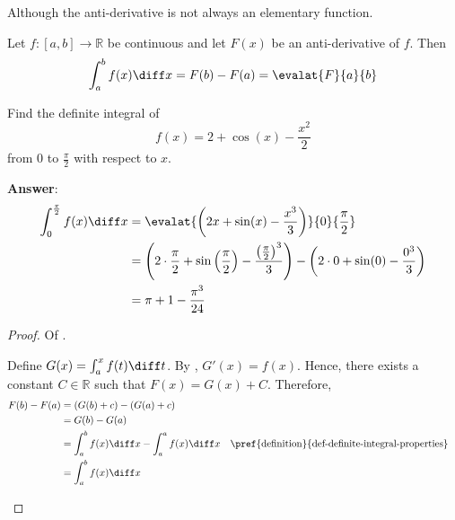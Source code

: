 \begin{rem}\label{rem-continuity-implies-anti-derivative}
	Although the anti-derivative is not always an elementary function.
\end{rem}

\begin{crl}\label{crl-newton-leibniz-formula}
	Let $f:[a,b]\to\mathbb{R}$ be continuous and let $F(x)$ be an anti-derivative
	of $f$. Then
	\begin{equation}\label{eq-newton-leibniz-formula}
		\int_a^b f(x) \diff x = F(b) - F(a) = \evalat{F}{a}{b}
	\end{equation}
\end{crl}

\begin{exm}\label{exm-newton-leibniz-formula:1}
	Find the definite integral of
	\begin{equation*}
		f(x) = 2 + \cos(x) - \frac{x^2}{2}
	\end{equation*}
	from $0$ to $\tfrac{\pi}{2}$ with respect to $x$.
	\begin{flushleft}
		\textbf{Answer}:
		\begin{align*}
			\int_0^{\frac{\pi}{2}} f(x) \diff x & = \evalat{\left(2x+\sin(x)-\frac{x^3}{3}\right)}{0}{\frac{\pi}{2}}                                       \\
			                                    & = \left(2\cdot\frac{\pi}{2}+\sin\left(\frac{\pi}{2}\right)-\frac{\left(\frac{\pi}{2}\right)^3}{3}\right)
			- \left(2\cdot0+\sin(0)-\frac{0^3}{3}\right)                                                                                                   \\
			                                    & = \pi+1-\frac{\pi^3}{24}
		\end{align*}
	\end{flushleft}
\end{exm}

\begin{proof}
	Of .
	\begin{flushleft}
		Define $G(x)=\int_a^x f(t) \diff t$. By ,
		$G'(x)=f(x)$. Hence, there exists a constant $C\in\mathbb{R}$ such that $F(x)=G(x)+C$.
		Therefore,
		\begin{align*}
			F(b) - F(a) & = (G(b)+c) - (G(a)+c)                                                                                           \\
			            & = G(b) - G(a)                                                                                                   \\
			            & = \int_a^b f(x) \diff x - \int_a^a f(x) \diff x &  & \text{\pref{definition}{def-definite-integral-properties}} \\
			            & = \int_a^b f(x) \diff x
		\end{align*}
	\end{flushleft}
\end{proof}

